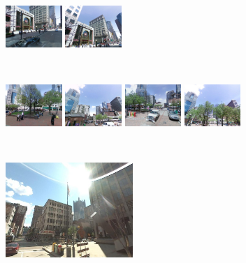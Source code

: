 \documentclass[10pt,twocolumn,letterpaper]{article}
\begin{document}
\begin{figure}[t!]
\begin{minipage}{0.75\linewidth}
\begin{minipage}{\linewidth}
                   \colorbox{myGreen}{\includegraphics[height=16mm]{imgs/ex2/FVsvm3.jpg}}
                   \colorbox{myGreen}{\includegraphics[height=16mm]{imgs/ex2/FVsvm4.jpg}}
               \end{minipage}
               \\
               \begin{minipage}{\linewidth}
                   \colorbox{myRed}{\includegraphics[height=16mm]{imgs/ex2/FV1.jpg}}
                   \colorbox{myRed}{\includegraphics[height=16mm]{imgs/ex2/FV2.jpg}}
                   \colorbox{myRed}{\includegraphics[height=16mm]{imgs/ex2/FV3.jpg}}
                   \colorbox{myRed}{\includegraphics[height=16mm]{imgs/ex2/FV4.jpg}}
               \end{minipage} 
            \end{minipage}
            \vspace{3mm}
            \\
            \begin{minipage}{0.34\linewidth}
               \centering
               \vspace{0mm}
               \includegraphics[height=36mm]{imgs/ex3/query.jpg}

\end{minipage}
\end{figure}
\end{document}
